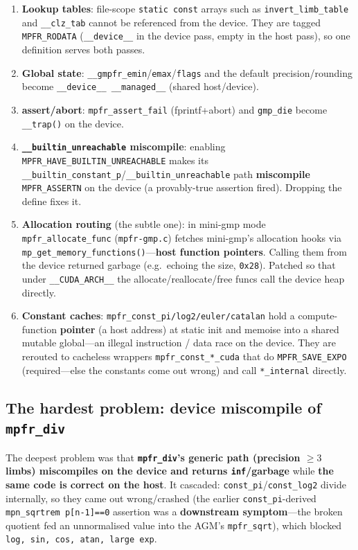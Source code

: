 \documentclass[uplatex,dvipdfmx,a4paper,11pt]{jsarticle}
\newcommand{\code}[1]{\texttt{#1}}
\begin{document}
\begin{enumerate}
\item \textbf{Lookup tables}: file-scope \code{static const} arrays such as
      \code{invert\_limb\_table} and \code{\_\_clz\_tab} cannot be referenced from
      the device. They are tagged \code{MPFR\_RODATA} (\code{\_\_device\_\_} in the
      device pass, empty in the host pass), so one definition serves both passes.
\item \textbf{Global state}: \code{\_\_gmpfr\_emin}/\code{emax}/\code{flags} and the
      default precision/rounding become \code{\_\_device\_\_ \_\_managed\_\_}
      (shared host/device).
\item \textbf{assert/abort}: \code{mpfr\_assert\_fail} (fprintf+abort) and
      \code{gmp\_die} become \code{\_\_trap()} on the device.
\item \textbf{\code{\_\_builtin\_unreachable} miscompile}: enabling
      \code{MPFR\_HAVE\_BUILTIN\_UNREACHABLE} makes its
      \code{\_\_builtin\_constant\_p}/\code{\_\_builtin\_unreachable} path
      \textbf{miscompile} \code{MPFR\_ASSERTN} on the device (a provably-true
      assertion fired). Dropping the define fixes it.
\item \textbf{Allocation routing} (the subtle one): in mini-gmp mode
      \code{mpfr\_allocate\_func} (\code{mpfr-gmp.c}) fetches mini-gmp's allocation
      hooks via \code{mp\_get\_memory\_functions()}---\textbf{host function
      pointers}. Calling them from the device returned garbage (e.g.\ echoing the
      size, \code{0x28}). Patched so that under \code{\_\_CUDA\_ARCH\_\_} the
      allocate/reallocate/free funcs call the device heap directly.
\item \textbf{Constant caches}: \code{mpfr\_const\_pi/log2/euler/catalan} hold a
      compute-function \textbf{pointer} (a host address) at static init and memoise
      into a shared mutable global---an illegal instruction / data race on the
      device. They are rerouted to cacheless wrappers
      \code{mpfr\_const\_*\_cuda} that do \code{MPFR\_SAVE\_EXPO} (required---else
      the constants come out wrong) and call \code{*\_internal} directly.
\end{enumerate}

\subsection{The hardest problem: device miscompile of \code{mpfr\_div}}

The deepest problem was that \textbf{\code{mpfr\_div}'s generic path
(precision $\ge 3$ limbs) miscompiles on the device and returns \code{inf}/garbage}
while \textbf{the same code is correct on the host}. It cascaded:
\code{const\_pi}/\code{const\_log2} divide internally, so they came out
wrong/crashed (the earlier \code{const\_pi}-derived \code{mpn\_sqrtrem p[n-1]==0}
assertion was a \textbf{downstream symptom}---the broken quotient fed an
unnormalised value into the AGM's \code{mpfr\_sqrt}), which blocked
\code{log, sin, cos, atan, large exp}.
\end{document}

